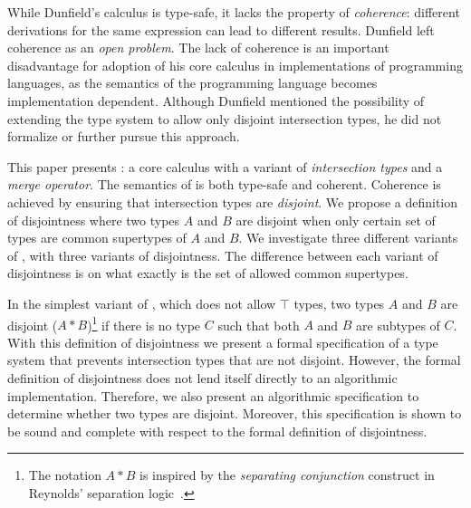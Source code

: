 
While Dunfield's calculus is type-safe, it lacks the property of
\emph{coherence}: different derivations for the same expression can
lead to different results. Dunfield left coherence as
an \emph{open problem}. The lack of coherence is an important
disadvantage for adoption of his core calculus in implementations of
programming languages, as the semantics of the programming language
becomes implementation dependent. Although Dunfield mentioned the
possibility of extending the type system to allow only disjoint
intersection types, he did not formalize or further pursue this
approach. 


\begin{comment}
Moreover, from the theoretic point-of-view, the ambiguity that arises
from the lack of coherence makes the calculus unsatisfying when the
goal is to precisely capture the essence of solutions to
extensibility.
\end{comment}

This paper presents \name: a core calculus with a variant of \emph{intersection
types} and a \emph{merge operator}. The semantics of \name is both type-safe and
coherent. Coherence is achieved by ensuring that intersection types are
\emph{disjoint}.  We propose a definition of disjointness where two
types $A$ and $B$ are disjoint when only certain set of types are common
supertypes of $A$ and $B$. We investigate three different variants of
\name, with three variants of disjointness. The difference between
each variant of disjointness is on what exactly is the set of allowed
common supertypes. 

In the simplest variant of \name, which does not allow $\top$ types,
two types $A$ and $B$ are disjoint ($A * B$)\footnote{The notation $A
  * B$ is inspired by the \emph{separating conjunction} construct in
  Reynolds' separation logic~\cite{reynolds2002separation}.} if there
is no type $C$ such that both $A$ and $B$ are subtypes of
$C$. 
With this definition of disjointness we present a formal specification
of a type system that prevents intersection types that are not
disjoint. However, the formal definition of disjointness does not lend
itself directly to an algorithmic implementation.  Therefore, we also
present an algorithmic specification to determine whether two types
are disjoint. Moreover, this specification is shown to be sound and
complete with respect to the formal definition of disjointness.

